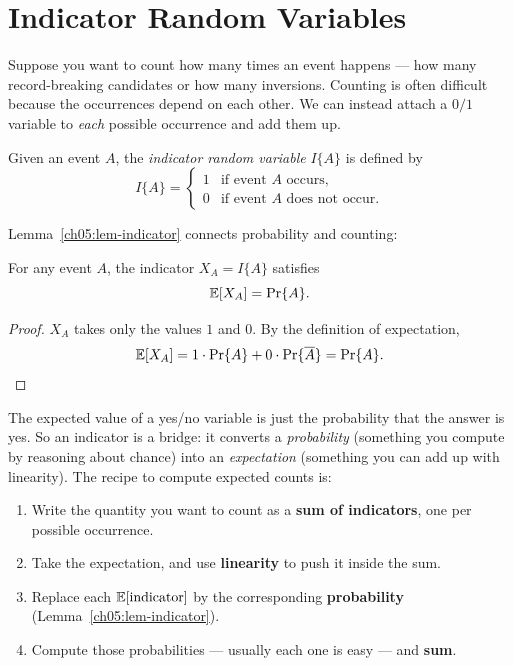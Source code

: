 \section{Indicator Random Variables}
\label{ch05:indicators}

Suppose you want to count how many times an event happens --- how many record-breaking candidates or how many inversions. Counting is often difficult because the occurrences depend on each other. We can instead attach a $0/1$ variable to \emph{each} possible occurrence and add them up.

\begin{definition}
\label{ch05:def-indicator}
Given an event $A$, the \emph{indicator random variable} $I\{A\}$ is defined by
\[
  I\{A\} =
  \begin{cases}
    1 & \text{if event } A \text{ occurs},\\
    0 & \text{if event } A \text{ does not occur}.
  \end{cases}
\]
\end{definition}

Lemma~\ref{ch05:lem-indicator} connects probability and counting:

\begin{lemma}
\label{ch05:lem-indicator}
For any event $A$, the indicator $X_A = I\{A\}$ satisfies
\[
  \mathbb{E}[X_A] = \Pr\{A\}.
\]
\end{lemma}

\begin{proof}
$X_A$ takes only the values $1$ and $0$. By the definition of expectation,
\[
  \mathbb{E}[X_A] = 1\cdot\Pr\{A\} + 0\cdot\Pr\{\overline{A}\} = \Pr\{A\}.
\qedhere
\]
\end{proof}

\begin{intuitionbox}
The expected value of a yes/no variable is just the probability that the answer
is yes. So an indicator is a bridge: it converts a \emph{probability} (something
you compute by reasoning about chance) into an \emph{expectation} (something you
can add up with linearity). The recipe to compute expected counts is:

\begin{enumerate}
  \item Write the quantity you want to count as a \textbf{sum of indicators},
        one per possible occurrence.
  \item Take the expectation, and use \textbf{linearity} to push it inside the
        sum.
  \item Replace each $\mathbb{E}[\text{indicator}]$ by the corresponding
        \textbf{probability} (Lemma~\ref{ch05:lem-indicator}).
  \item Compute those probabilities --- usually each one is easy --- and
        \textbf{sum}.
\end{enumerate}
\end{intuitionbox}

